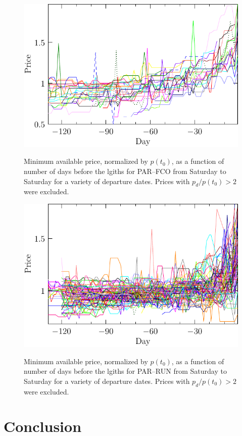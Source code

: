 \documentclass{article}
\begin{document}
\begin{figure}
  \begin{center}
    \includegraphics{pdf/PARFCO_SAT_7_norm}
    \label{PARFCO_SAT_7_norm}
    \caption{Minimum available price, normalized by $p(t_0)$, as a
      function of number of days before the lgiths for PAR--FCO from
      Saturday to Saturday for a variety of departure dates. Prices
      with $p_d/p(t_0) > 2$ were excluded.}
  \end{center}
\end{figure}

\begin{figure}
  \begin{center}
    \includegraphics{pdf/PARRUN_SAT_7_norm}
    \label{PARRUN_SAT_7_norm}
    \caption{Minimum available price, normalized by $p(t_0)$, as a
      function of number of days before the lgiths for PAR--RUN from
      Saturday to Saturday for a variety of departure dates.  Prices
      with $p_d/p(t_0) > 2$ were excluded.}
  \end{center}
\end{figure}





\section{Conclusion}
\end{document}
